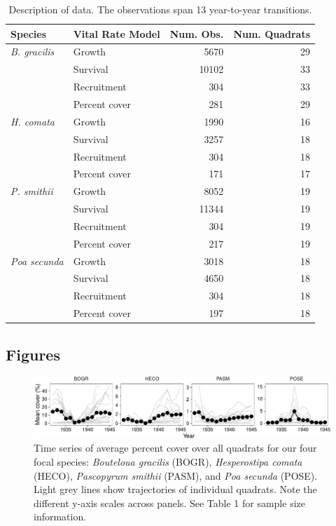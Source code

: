 \documentclass[12pt,]{article}
\begin{document}
\begin{table}[ht]
\centering
\caption{Description of data. The observations span 13 year-to-year transitions.} 
\begin{tabular}{llrr}
  \hline
Species & Vital Rate Model & Num. Obs. & Num. Quadrats\\ 
  \hline
  \emph{B. gracilis} & Growth & 5670 & 29 \\ 
       & Survival & 10102 & 33 \\ 
       & Recruitment & 304 & 33 \\ 
       & Percent cover & 281 & 29 \\ 
  \rule{0pt}{3ex} \emph{H. comata} & Growth & 1990 & 16 \\ 
       & Survival & 3257 & 18 \\ 
       & Recruitment & 304 & 18 \\ 
       & Percent cover & 171 & 17 \\ 
  \rule{0pt}{3ex} \emph{P. smithii} & Growth & 8052 & 19 \\ 
       & Survival & 11344 & 19 \\ 
       & Recruitment & 304 & 19 \\ 
       & Percent cover & 217 & 19 \\ 
  \rule{0pt}{3ex} \emph{Poa secunda} & Growth & 3018 & 18 \\ 
       & Survival & 4650 & 18 \\ 
       & Recruitment & 304 & 18 \\ 
       & Percent cover & 197 & 18 \\ 
   \hline
\end{tabular}
\end{table}

\newpage{}

\subsection{Figures}\label{figures}

\begin{figure}[htbp]
\centering
\includegraphics{components/figure/manuscript-figure_1-1.pdf}
\caption{Time series of average percent cover over all quadrats for our
four focal species: \emph{Bouteloua gracilis} (BOGR), \emph{Hesperostipa
comata} (HECO), \emph{Pascopyrum smithii} (PASM), and \emph{Poa secunda}
(POSE). Light grey lines show trajectories of individual quadrats. Note
the different y-axis scales across panels. See Table 1 for sample size
information.}
\end{figure}
\end{document}
